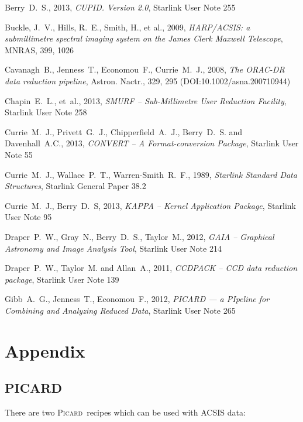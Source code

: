 \documentclass[twoside,11pt]{article}
\newcommand{\htmladdnormallink}[2]{#1}
\newcommand{\xref}[3]{#1}
\renewcommand{\_}{\texttt{\symbol{95}}}
\newcommand{\picard}{\xref{\textsc{Picard}}{sun265}{}}
\begin{document}
\begin{thebibliography}{}


Berry~D.~S., 2013, \textit{CUPID. Version 2.0}, \xref{Starlink User Note 255}{sun255}{}

Buckle, J.~V., Hills, R.~E., Smith, H., et al., 2009,
\textit{HARP/ACSIS: a submillimetre spectral imaging system on the James Clerk Maxwell Telescope},
MNRAS, 399, 1026

Cavanagh~B., Jenness~T., Economou~F., Currie~M.~J., 2008,
\htmladdnormallink{\textit{The ORAC-DR data reduction pipeline}}{http://dx.doi.org/10.1002/asna.200710944}, Astron. Nactr., 329, 295 (DOI:10.1002/asna.200710944)

Chapin~E.~L., et~al., 2013, \textit{SMURF -- Sub-Millimetre User Reduction
Facility}, \xref{Starlink User Note 258}{sun258}{}

Currie~M.~J., Privett~G.~J., Chipperfield~A.~J., Berry~D.~S. and Davenhall~A.C., 2013, \textit{CONVERT -- A Format-conversion Package}, \xref{Starlink User Note 55}{sun55}{}

Currie~M.~J., Wallace~P.~T., Warren-Smith~R.~F., 1989,
\textit{Starlink Standard Data Structures}, \xref{Starlink General
Paper 38.2}{sgp38}{}

Currie~M.~J., Berry~D.~S, 2013, \textit{KAPPA -- Kernel Application Package},
\xref{Starlink User Note 95}{sun95}{}

Draper~P.~W., Gray~N., Berry~D.~S., Taylor~M., 2012,
\textit{GAIA -- Graphical Astronomy and Image Analysis Tool},
\xref{Starlink User Note 214}{sun214}{}

Draper~P.~W., Taylor~M. and Allan~A., 2011, \textit{CCDPACK -- CCD data reduction package},
\xref{Starlink User Note 139}{sun139}{}

Gibb~A.~G., Jenness~T., Economou~F., 2012, \textit{PICARD --- a
PIpeline for Combining and Analyzing Reduced Data},
\xref{Starlink User Note 265}{sun265}{}

\end{thebibliography}

\newpage
\appendix
\section[Appendices]{Appendix}

\subsection{PICARD}
\label{app:picard}
There are two \picard\ recipes which can be used with ACSIS data:
\end{document}
